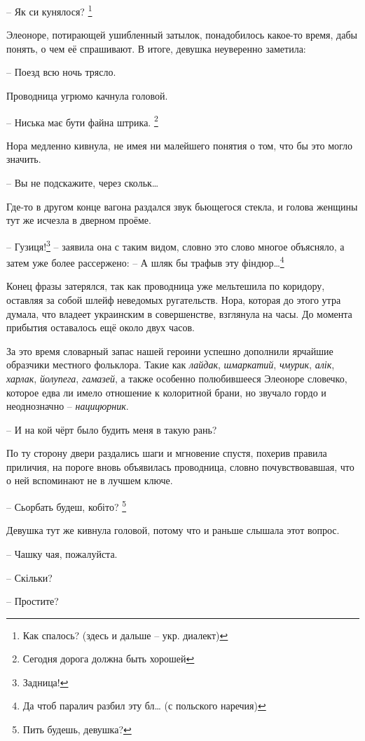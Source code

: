 \documentclass[
  a5paperpaper,
  DIV=11,
  numbers=noendperiod]{scrreprt}
\begin{document}
-- Як си кунялося? \footnote{Как спалось? (здесь и дальше -- укр.
  диалект)}

Элеоноре, потирающей ушибленный затылок, понадобилось какое-то время,
дабы понять, о чем её спрашивают. В итоге, девушка неуверенно заметила:

-- Поезд всю ночь трясло.

Проводница угрюмо качнула головой.

-- Ниська має бути файна штрика. \footnote{Сегодня дорога должна быть
  хорошей}

Нора медленно кивнула, не имея ни малейшего понятия о том, что бы это
могло значить.

-- Вы не подскажите, через скольк\ldots{}

Где-то в другом конце вагона раздался звук бьющегося стекла, и голова
женщины тут же исчезла в дверном проёме.

-- Гузиця!\footnote{Задница!} -- заявила она с таким видом, словно это
слово многое объясняло, а затем уже более рассержено: -- А шляк бы
трафыв эту фіндюр\ldots{}\footnote{Да чтоб паралич разбил эту бл\ldots{}
  (с польского наречия)}

Конец фразы затерялся, так как проводница уже мельтешила по коридору,
оставляя за собой шлейф неведомых ругательств. Нора, которая до этого
утра думала, что владеет украинским в совершенстве, взглянула на часы.
До момента прибытия оставалось ещё около двух часов.

За это время словарный запас нашей героини успешно дополнили ярчайшие
образчики местного фольклора. Такие как \emph{лайдак}, \emph{шмаркатий},
\emph{чмурик}, \emph{алік}, \emph{харлак}, \emph{йолупега},
\emph{гамазей}, а также особенно полюбившееся Элеоноре словечко, которое
едва ли имело отношение к колоритной брани, но звучало гордо и
неоднозначно -- \emph{нацицюрник}.

-- И на кой чёрт было будить меня в такую рань?

По ту сторону двери раздались шаги и мгновение спустя, похерив правила
приличия, на пороге вновь объявилась проводница, словно почувствовавшая,
что о ней вспоминают не в лучшем ключе.

-- Сьорбать будеш, кобіто? \footnote{Пить будешь, девушка?}

Девушка тут же кивнула головой, потому что и раньше слышала этот вопрос.

-- Чашку чая, пожалуйста.

-- Скільки?

-- Простите?
\end{document}
